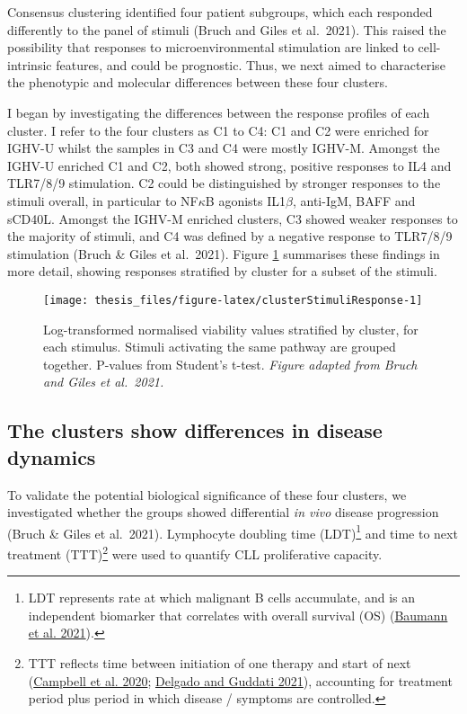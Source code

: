 \documentclass[11pt, a4paper, twosided]{book}
\begin{document}
Consensus clustering identified four patient subgroups, which each responded differently to the panel of stimuli (Bruch and Giles et al.~2021). This raised the possibility that responses to microenvironmental stimulation are linked to cell-intrinsic features, and could be prognostic. Thus, we next aimed to characterise the phenotypic and molecular differences between these four clusters.

I began by investigating the differences between the response profiles of each cluster. I refer to the four clusters as C1 to C4: C1 and C2 were enriched for IGHV-U whilst the samples in C3 and C4 were mostly IGHV-M. Amongst the IGHV-U enriched C1 and C2, both showed strong, positive responses to IL4 and TLR7/8/9 stimulation. C2 could be distinguished by stronger responses to the stimuli overall, in particular to NF\(\kappa\)B agonists IL1\(\beta\), anti-IgM, BAFF and sCD40L. Amongst the IGHV-M enriched clusters, C3 showed weaker responses to the majority of stimuli, and C4 was defined by a negative response to TLR7/8/9 stimulation (Bruch \& Giles et al.~2021). Figure \ref{fig:clusterStimuliResponse} summarises these findings in more detail, showing responses stratified by cluster for a subset of the stimuli.


\begin{figure}

{\centering \texttt{[image: thesis\_files/figure-latex/clusterStimuliResponse-1]} 

}

\caption{Log-transformed normalised viability values stratified by cluster, for each stimulus. Stimuli activating the same pathway are grouped together. P-values from Student's t-test. \emph{Figure adapted from Bruch and Giles et al.~2021. }}\label{fig:clusterStimuliResponse}
\end{figure}
\hypertarget{cluster-survival}{%
\subsection{The clusters show differences in disease dynamics}\label{cluster-survival}}

To validate the potential biological significance of these four clusters, we investigated whether the groups showed differential \emph{in vivo} disease progression (Bruch \& Giles et al.~2021). Lymphocyte doubling time (LDT)\footnote{LDT represents rate at which malignant B cells accumulate, and is an independent biomarker that correlates with overall survival (OS) (\protect\hyperlink{ref-Baumann2021}{Baumann et al. 2021}).} and time to next treatment (TTT)\footnote{TTT reflects time between initiation of one therapy and start of next (\protect\hyperlink{ref-Campbell2020}{Campbell et al. 2020}; \protect\hyperlink{ref-Delgado2021}{Delgado and Guddati 2021}), accounting for treatment period plus period in which disease / symptoms are controlled.} were used to quantify CLL proliferative capacity.
\end{document}
